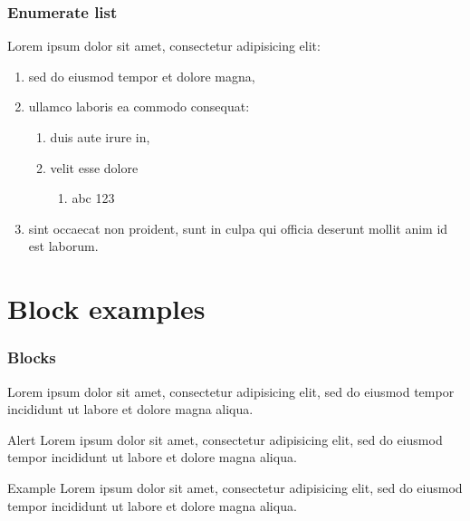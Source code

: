 \documentclass{beamer}
\begin{document}
\begin{frame}
	\frametitle{Enumerate list}

    Lorem ipsum dolor sit amet, consectetur adipisicing elit:
		\begin{enumerate}
			\item sed do eiusmod tempor et dolore magna,
      \item ullamco laboris ea commodo consequat:
      \begin{enumerate}
        \item duis aute irure in,
        \item velit esse dolore
        \begin{enumerate}
          \item abc 123
         \end{enumerate}
      \end{enumerate}
      \item sint occaecat non proident, sunt in culpa qui officia 
        deserunt mollit anim id est laborum.
		\end{enumerate}

\end{frame}	

\section{Block examples}

\begin{frame}
	\frametitle{Blocks}
	
		\begin{theorem}[It's a theorem]
			Lorem ipsum dolor sit amet, consectetur adipisicing elit, sed do eiusmod tempor incididunt ut labore et dolore magna aliqua. 		
    \end{theorem}
		
		\begin{alertblock}{Alert}
			Lorem ipsum dolor sit amet, consectetur adipisicing elit, sed do eiusmod tempor incididunt ut labore et dolore magna aliqua. 		
		\end{alertblock}

		\begin{exampleblock}{Example}
			Lorem ipsum dolor sit amet, consectetur adipisicing elit, sed do eiusmod tempor incididunt ut labore et dolore magna aliqua. 		
		\end{exampleblock}
		
\end{frame}	
\end{document}
